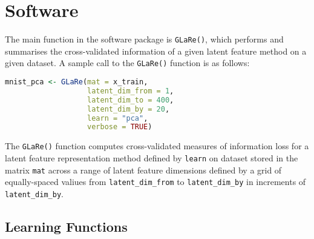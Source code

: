 \section{Software}\label{sec:software}

The main function in the  software package is \texttt{GLaRe()}, which performs and summarises the cross-validated information of a given latent feature method on a given dataset.
A sample call to the \texttt{GLaRe()} function is as follows:
\begin{lstlisting}[language=R]
mnist_pca <- GLaRe(mat = x_train,
                   latent_dim_from = 1,
                   latent_dim_to = 400,
                   latent_dim_by = 20,
                   learn = "pca",
                   verbose = TRUE)
\end{lstlisting}
The \texttt{GLaRe()} function computes cross-validated measures of information loss for a latent feature representation method defined by \texttt{learn} on dataset stored in the matrix \texttt{mat} across a range of latent feature dimensions defined by a grid of equally-spaced valiues from \texttt{latent\_dim\_from} to \texttt{latent\_dim\_by} in increments of \texttt{latent\_dim\_by}.

\subsection{Learning Functions}

